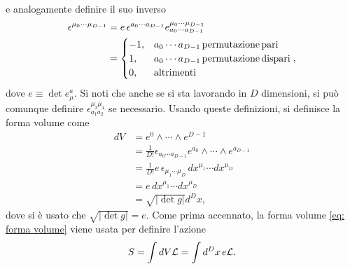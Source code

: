 e analogamente definire il suo inverso
\begin{equation}
    \begin{aligned}
        \epsilon^{\mu_0\cdots \mu_{D - 1}} &= e\,\epsilon^{a_0\cdots a_{D - 1}}e_{a_0\cdots a_{D - 1}}^{\mu_0\cdots \mu_{D - 1}} \\
        &= \begin{cases}
            -1, &a_0\cdots a_{D-1}\,\mathrm{permutazione\,pari} \\
            1, &a_0\cdots a_{D-1}\,\mathrm{permutazione\,dispari} \\
            0, &\mathrm{altrimenti}
        \end{cases},
    \end{aligned}
\end{equation}
dove $e \equiv \det{e^a_\mu}$. Si noti che anche se si sta lavorando in $D$ dimensioni, si può comunque definire $\epsilon_{a_1a_2}^{\mu_3\mu_4}$ se necessario. Usando queste definizioni, si definisce la forma volume come 
\begin{equation}
\label{eq: forma volume}
    \begin{split}
        dV &= e^0 \wedge \cdots \wedge e^{D - 1} \\
        &= \frac{1}{D!}\epsilon_{a_0\cdots a_{D - 1}}e^{a_0}\wedge\cdots\wedge e^{a_{D - 1}} \\
        &= \frac{1}{D!}e\,\epsilon_{\mu_1\cdots\mu_D}\,dx^{\mu_1}\cdots dx^{\mu_D} \\
        &= e\,dx^{\mu_1}\cdots dx^{\mu_D} \\
        &= \sqrt{|\det{g}|}d^Dx,
    \end{split}
\end{equation}
dove si è usato che $\sqrt{|\det{g}|} = e$. Come prima accennato, la forma volume \eqref{eq: forma volume} viene usata per definire l'azione
\begin{equation}
    S = \int dV\mathcal{L} = \int d^Dx\,e\mathcal{L}.
\end{equation}

